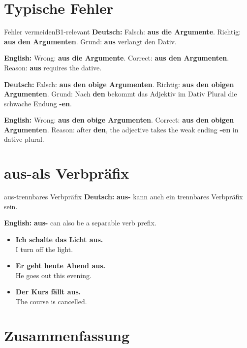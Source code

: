 \documentclass[a4paper,11pt]{article}
\newcommand{\GermanText}[1]{\textbf{Deutsch: }#1\par}
\newcommand{\EnglishText}[1]{{\small\color{SoftGray}\textbf{English: }#1\par}}
\newcommand{\ExampleItem}[2]{\item \textbf{#1}\\{\small\color{SoftGray}#2}}
\begin{document}
\section{Typische Fehler}

\begin{grammarentry}{Fehler vermeiden}{B1-relevant}
\GermanText{Falsch: \textbf{aus die Argumente}. Richtig: \textbf{aus den Argumenten}. Grund: \textbf{aus} verlangt den Dativ.}
\EnglishText{Wrong: \textbf{aus die Argumente}. Correct: \textbf{aus den Argumenten}. Reason: \textbf{aus} requires the dative.}

\GermanText{Falsch: \textbf{aus den obige Argumenten}. Richtig: \textbf{aus den obigen Argumenten}. Grund: Nach \textbf{den} bekommt das Adjektiv im Dativ Plural die schwache Endung \textbf{-en}.}
\EnglishText{Wrong: \textbf{aus den obige Argumenten}. Correct: \textbf{aus den obigen Argumenten}. Reason: after \textbf{den}, the adjective takes the weak ending \textbf{-en} in dative plural.}
\end{grammarentry}

\section{\glqq aus-\grqq als Verbpräfix}

\begin{grammarentry}{aus-}{trennbares Verbpräfix}
\GermanText{\textbf{aus-} kann auch ein trennbares Verbpräfix sein.}
\EnglishText{\textbf{aus-} can also be a separable verb prefix.}
\end{grammarentry}

\begin{exbox}
\begin{itemize}
\ExampleItem{Ich schalte das Licht aus.}{I turn off the light.}
\ExampleItem{Er geht heute Abend aus.}{He goes out this evening.}
\ExampleItem{Der Kurs fällt aus.}{The course is cancelled.}
\end{itemize}
\end{exbox}

\section{Zusammenfassung}
\end{document}
